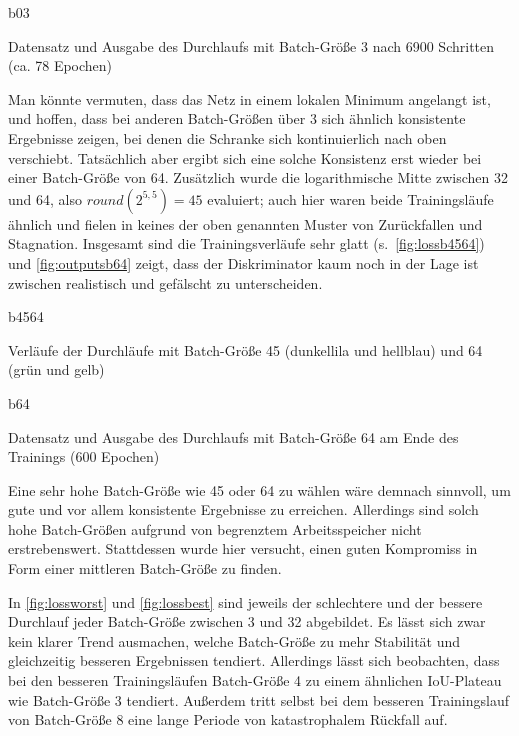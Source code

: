 \begin{outputs}{b03}
	\caption[Datensatz und Ausgabe des Durchlaufs mit Batch-Größe 3 nach 6900 Schritten]{Datensatz und Ausgabe des Durchlaufs mit Batch-Größe 3 nach 6900 Schritten (ca. 78 Epochen)}
	\label{fig:outputsb03}
\end{outputs}

Man könnte vermuten, dass das Netz in einem lokalen Minimum angelangt ist, und hoffen, dass bei anderen Batch-Größen über 3 sich ähnlich konsistente Ergebnisse zeigen, bei denen die Schranke sich kontinuierlich nach oben verschiebt.
Tatsächlich aber ergibt sich eine solche Konsistenz erst wieder bei einer Batch-Größe von 64.
Zusätzlich wurde die logarithmische Mitte zwischen 32 und 64, also $ round(2^{5,5}) = 45 $ evaluiert; auch hier waren beide Trainingsläufe ähnlich und fielen in keines der oben genannten Muster von Zurückfallen und Stagnation.
Insgesamt sind die Trainingsverläufe sehr glatt (s.~\autoref{fig:lossb4564}) und \autoref{fig:outputsb64} zeigt, dass der Diskriminator kaum noch in der Lage ist zwischen realistisch und gefälscht zu unterscheiden.

\begin{losses}{b4564}
	\caption[Verläufe der Durchläufe mit Batch-Größe 45 und 64]{Verläufe der Durchläufe mit Batch-Größe 45 (dunkellila und hellblau) und 64 (grün und gelb)}
	\label{fig:lossb4564}
\end{losses}

\begin{outputs}{b64}
	\caption[Datensatz und Ausgabe des Durchlaufs mit Batch-Größe 64 am Ende des Trainings]{Datensatz und Ausgabe des Durchlaufs mit Batch-Größe 64 am Ende des Trainings (600 Epochen)}
	\label{fig:outputsb64}
\end{outputs}

Eine sehr hohe Batch-Größe wie 45 oder 64 zu wählen wäre demnach sinnvoll, um gute und vor allem konsistente Ergebnisse zu erreichen.
Allerdings sind solch hohe Batch-Größen aufgrund von begrenztem Arbeitsspeicher nicht erstrebenswert.
Stattdessen wurde hier versucht, einen guten Kompromiss in Form einer mittleren Batch-Größe zu finden.

In \autoref{fig:lossworst} und \autoref{fig:lossbest} sind jeweils der schlechtere und der bessere Durchlauf jeder Batch-Größe zwischen 3 und 32 abgebildet.
Es lässt sich zwar kein klarer Trend ausmachen, welche Batch-Größe zu mehr Stabilität und gleichzeitig besseren Ergebnissen tendiert.
Allerdings lässt sich beobachten, dass bei den besseren Trainingsläufen Batch-Größe 4 zu einem ähnlichen IoU-Plateau wie Batch-Größe 3 tendiert.
Außerdem tritt selbst bei dem besseren Trainingslauf von Batch-Größe 8 eine lange Periode von katastrophalem Rückfall auf.

